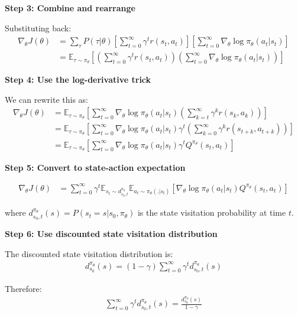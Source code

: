 \textbf{Step 3: Combine and rearrange}

Substituting back:
\begin{align}
\nabla_\theta J(\theta) &= \sum_{\tau} P(\tau|\theta) \left[ \sum_{t=0}^{\infty} \gamma^t r(s_t, a_t) \right] \left[ \sum_{t=0}^{\infty} \nabla_\theta \log \pi_\theta(a_t|s_t) \right] \\
&= \mathbb{E}_{\tau \sim \pi_\theta} \left[ \left( \sum_{t=0}^{\infty} \gamma^t r(s_t, a_t) \right) \left( \sum_{t=0}^{\infty} \nabla_\theta \log \pi_\theta(a_t|s_t) \right) \right]
\end{align}

\textbf{Step 4: Use the log-derivative trick}

We can rewrite this as:
\begin{align}
\nabla_\theta J(\theta) &= \mathbb{E}_{\tau \sim \pi_\theta} \left[ \sum_{t=0}^{\infty} \nabla_\theta \log \pi_\theta(a_t|s_t) \left( \sum_{k=t}^{\infty} \gamma^k r(s_k, a_k) \right) \right] \\
&= \mathbb{E}_{\tau \sim \pi_\theta} \left[ \sum_{t=0}^{\infty} \nabla_\theta \log \pi_\theta(a_t|s_t) \gamma^t \left( \sum_{k=0}^{\infty} \gamma^k r(s_{t+k}, a_{t+k}) \right) \right] \\
&= \mathbb{E}_{\tau \sim \pi_\theta} \left[ \sum_{t=0}^{\infty} \nabla_\theta \log \pi_\theta(a_t|s_t) \gamma^t Q^{\pi_\theta}(s_t, a_t) \right]
\end{align}

\textbf{Step 5: Convert to state-action expectation}

\begin{align}
\nabla_\theta J(\theta) &= \sum_{t=0}^{\infty} \gamma^t \mathbb{E}_{s_t \sim d^{\pi_\theta}_{s_0,t}} \mathbb{E}_{a_t \sim \pi_\theta(.|s_t)} \left[ \nabla_\theta \log \pi_\theta(a_t|s_t) Q^{\pi_\theta}(s_t, a_t) \right]
\end{align}

where $d^{\pi_\theta}_{s_0,t}(s) = P(s_t = s | s_0, \pi_\theta)$ is the state visitation probability at time $t$.

\textbf{Step 6: Use discounted state visitation distribution}

The discounted state visitation distribution is:
\begin{align}
d^{\pi_\theta}_{s_0}(s) = (1-\gamma) \sum_{t=0}^{\infty} \gamma^t d^{\pi_\theta}_{s_0,t}(s)
\end{align}

Therefore:
\begin{align}
\sum_{t=0}^{\infty} \gamma^t d^{\pi_\theta}_{s_0,t}(s) = \frac{d^{\pi_\theta}_{s_0}(s)}{1-\gamma}
\end{align}

